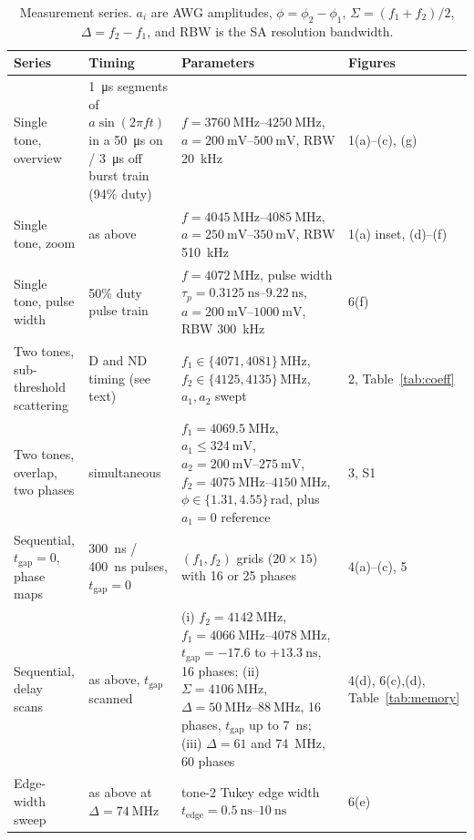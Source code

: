 \documentclass[aps,prb,reprint,superscriptaddress,floatfix]{revtex4-2}
\newcommand{\tgap}{t_{\mathrm{gap}}}
\begin{document}
\begin{table}
\caption{Measurement series. $a_i$ are AWG amplitudes, $\phi=\phi_2-\phi_1$, $\Sigma=(f_1+f_2)/2$, $\Delta=f_2-f_1$, and RBW is the SA resolution bandwidth.}
\label{tab:series}
\begin{ruledtabular}
\begin{tabular}{p{2.9cm}p{5.3cm}p{6.6cm}p{2.0cm}}
Series & Timing & Parameters & Figures\\
\hline
Single tone, overview & \SI{1}{\micro\second} segments of $a\sin(2\pi ft)$ in a \SI{50}{\micro\second} on / \SI{3}{\micro\second} off burst train (94\% duty) & $f=\SIrange{3760}{4250}{\mega\hertz}$, $a=\SIrange{200}{500}{\milli\volt}$, RBW \SI{20}{\kilo\hertz} & 1(a)--(c), (g)\\
Single tone, zoom & as above & $f=\SIrange{4045}{4085}{\mega\hertz}$, $a=\SIrange{250}{350}{\milli\volt}$, RBW \SI{510}{\kilo\hertz} & 1(a) inset, (d)--(f)\\
Single tone, pulse width & 50\% duty pulse train & $f=\SI{4072}{\mega\hertz}$, pulse width $\tau_p=\SIrange{0.3125}{9.22}{\nano\second}$, $a=\SIrange{200}{1000}{\milli\volt}$, RBW \SI{300}{\kilo\hertz} & 6(f)\\
Two tones, sub-threshold scattering & D and ND timing (see text) & $f_1\in\{4071,4081\}$\,MHz, $f_2\in\{4125,4135\}$\,MHz, $a_1,a_2$ swept & 2, Table~\ref{tab:coeff}\\
Two tones, overlap, two phases & simultaneous & $f_1=\SI{4069.5}{\mega\hertz}$, $a_1\le\SI{324}{\milli\volt}$, $a_2=\SIrange{200}{275}{\milli\volt}$, $f_2=\SIrange{4075}{4150}{\mega\hertz}$, $\phi\in\{1.31,4.55\}$\,rad, plus $a_1=0$ reference & 3, S1\\
Sequential, $\tgap=0$, phase maps & \SI{300}{\nano\second} / \SI{400}{\nano\second} pulses, $\tgap=0$ & $(f_1,f_2)$ grids ($20\times15$) with 16 or 25 phases & 4(a)--(c), 5\\
Sequential, delay scans & as above, $\tgap$ scanned & (i) $f_2=\SI{4142}{\mega\hertz}$, $f_1=\SIrange{4066}{4078}{\mega\hertz}$, $\tgap=-17.6$ to $+\SI{13.3}{\nano\second}$, 16 phases; (ii) $\Sigma=\SI{4106}{\mega\hertz}$, $\Delta=\SIrange{50}{88}{\mega\hertz}$, 16 phases, $\tgap$ up to \SI{7}{\nano\second}; (iii) $\Delta=61$ and \SI{74}{\mega\hertz}, 60 phases & 4(d), 6(c),(d), Table~\ref{tab:memory}\\
Edge-width sweep & as above at $\Delta=\SI{74}{\mega\hertz}$ & tone-2 Tukey edge width $t_{\mathrm{edge}}=\SIrange{0.5}{10}{\nano\second}$ & 6(e)\\
\end{tabular}
\end{ruledtabular}
\end{table}
\end{document}
